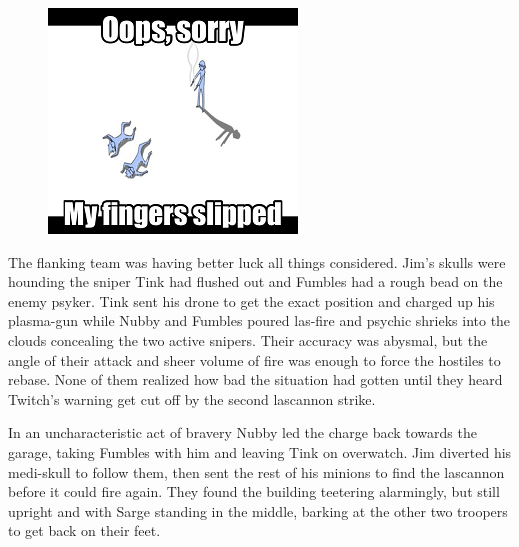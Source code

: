 \begin{figure}
	\begin{center}
		\includegraphics[width=\figwidth]{pics/11/25.png}
	\end{center}
\end{figure}
The flanking team was having better luck all things considered. 
Jim's skulls were hounding the sniper Tink had flushed out and Fumbles had a rough bead on the enemy psyker. 
Tink sent his drone to get the exact position and charged up his plasma-gun while Nubby and Fumbles poured las-fire and psychic shrieks into the clouds concealing the two active snipers. 
Their accuracy was abysmal, but the angle of their attack and sheer volume of fire was enough to force the hostiles to rebase. 
None of them realized how bad the situation had gotten until they heard Twitch's warning get cut off by the second lascannon strike.

In an uncharacteristic act of bravery Nubby led the charge back towards the garage, taking Fumbles with him and leaving Tink on overwatch. 
Jim diverted his medi-skull to follow them, then sent the rest of his minions to find the lascannon before it could fire again. 
They found the building teetering alarmingly, but still upright and with Sarge standing in the middle, barking at the other two troopers to get back on their feet.

